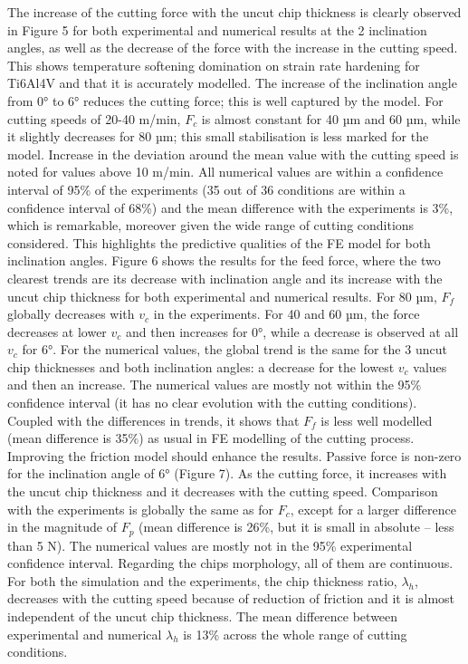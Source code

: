 \documentclass[final,5p,times,twocolumn]{elsarticle}
\begin{document}
The increase of the cutting force with the uncut chip thickness is clearly observed in Figure 5 for both experimental and numerical results at the 2 inclination angles, as well as the decrease of the force with the increase in the cutting speed. This shows temperature softening domination on strain rate hardening for Ti6Al4V and that it is accurately modelled. The increase of the inclination angle from 0° to 6° reduces the cutting force; this is well captured by the model. For cutting speeds of 20-40 m/min, $F_c$ is almost constant for 40 µm and 60 µm, while it slightly decreases for 80 µm; this small stabilisation is less marked for the model.
Increase in the deviation around the mean value with the cutting speed is noted for values above 10 m/min. All numerical values are within a confidence interval of 95\% of the experiments (35 out of 36 conditions are within a confidence interval of 68\%) and the mean difference with the experiments is 3\%, which is remarkable, moreover given the wide range of cutting conditions considered. This highlights the predictive qualities of the FE model for both inclination angles.
Figure 6 shows the results for the feed force, where the two clearest trends are its decrease with inclination angle and its increase with the uncut chip thickness for both experimental and numerical results. For 80 µm, $F_f$ globally decreases with $v_c$ in the experiments. For 40 and 60 µm, the force decreases at lower $v_c$ and then increases for 0°, while a decrease is observed at all $v_c$ for 6°. For the numerical values, the global trend is the same for the 3 uncut chip thicknesses and both inclination angles: a decrease for the lowest $v_c$ values and then an increase. The numerical values are mostly not within the 95\% confidence interval (it has no clear evolution with the cutting conditions). Coupled with the differences in trends, it shows that $F_f$ is less well modelled (mean difference is 35\%) as usual in FE modelling of the cutting process. Improving the friction model should enhance the results.
Passive force is non-zero for the inclination angle of 6° (Figure 7). As the cutting force, it increases with the uncut chip thickness and it decreases with the cutting speed. Comparison with the experiments is globally the same as for $F_c$, except for a larger difference in the magnitude of $F_p$ (mean difference is 26\%, but it is small in absolute – less than 5 N). The numerical values are mostly not in the 95\% experimental confidence interval.
Regarding the chips morphology, all of them are continuous. For both the simulation and the experiments, the chip thickness ratio, $\lambda_h$, decreases with the cutting speed because of reduction of friction and it is almost independent of the uncut chip thickness. The mean difference between experimental and numerical $\lambda_h$ is 13\% across the whole range of cutting conditions.
\end{document}
